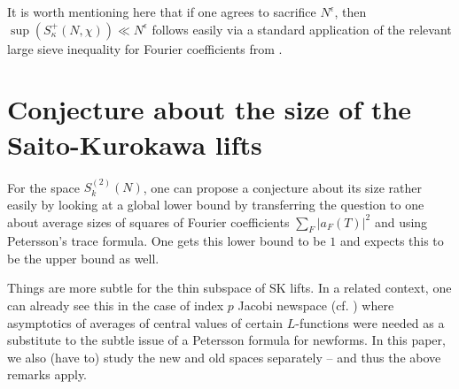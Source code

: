\documentclass[11pt]{amsart}
\numberwithin{equation}{section}
\theoremstyle{plain}
\theoremstyle{definition}
\newcommand{\stwon}{S^{(2)}_k(N)}
\begin{document}
It is worth mentioning here that if one agrees to sacrifice $N^\epsilon$, then $\sup( S^+_\kappa(N,\chi)) \ll N^\epsilon$ follows easily via a standard application of the relevant large sieve inequality for Fourier coefficients from \cite{lam2014local}.

\section{Conjecture about the size of the Saito-Kurokawa lifts} \label{skN-conj}
For the space $\stwon$, one can propose a conjecture about its size rather easily by looking at a global lower bound by transferring the question to one about average sizes of squares of Fourier coefficients $\sum_F |a_F(T)|^2$ and using Petersson's trace formula. One gets this lower bound to be $1$ and expects this to be the upper bound as well. 

Things are more subtle for the thin subspace of SK lifts. In a related context, one can already see this in the case of index $p$ Jacobi newspace (cf. \cite[Proof of Prop.~5.1]{PASD}) where asymptotics of averages of central values of certain $L$-functions were needed as a substitute to the subtle issue of a Petersson formula for newforms. In this paper, we also (have to) study the new and old spaces separately -- and thus the above remarks apply.
\end{document}
